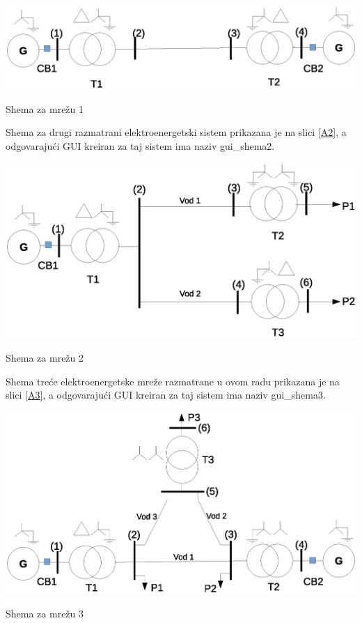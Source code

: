 \documentclass[a4paper, 12pt]{article}
\numberwithin{figure}{section}
\numberwithin{equation}{section}
\begin{document}
\begin{center}
    \captionsetup{type=figure}
    \begin{center}
        \includegraphics[width=\textwidth]{slike/shema1.eps}
        \caption{Shema za mrežu 1}
        \label{A1}
    \end{center}
\end{center}

Shema za drugi razmatrani elektroenergetski sistem prikazana je na slici \ref{A2}, a odgovarajući GUI kreiran za taj sistem ima naziv gui\_shema2.

\begin{center}
    \captionsetup{type=figure}
    \begin{center}
        \includegraphics[width=\textwidth]{slike/shema2.eps}
        \caption{Shema za mrežu 2}
        \label{A2}
    \end{center}
\end{center}

Shema treće elektroenergetske mreže razmatrane u ovom radu prikazana je na slici \ref{A3}, a odgovarajući GUI kreiran za taj sistem ima naziv gui\_shema3.

\begin{center}
    \captionsetup{type=figure}
    \begin{center}
        \includegraphics[width=\textwidth]{slike/shema3.eps}
        \caption{Shema za mrežu 3}
        \label{A3}
    \end{center}
\end{center}
\end{document}
